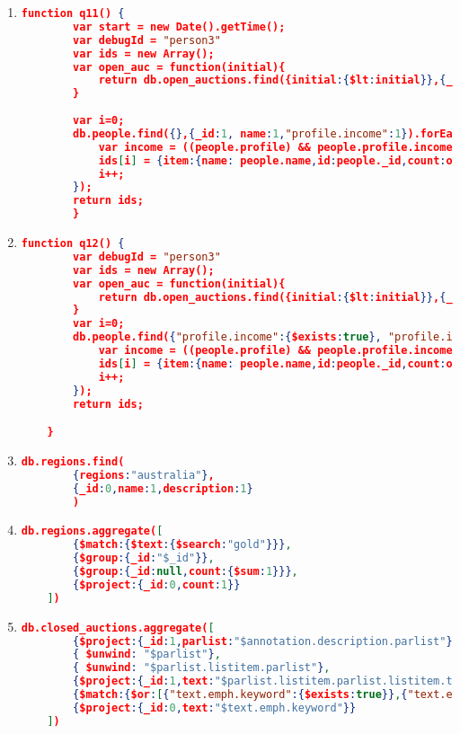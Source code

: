 \begin{enumerate}[label=Q\arabic*.]
\begin{lstlisting}[language=JSON,   basicstyle=\scriptsize]
    }
	\end{lstlisting}
	
	
    \item %
	\begin{lstlisting}[language=JSON,   basicstyle=\scriptsize]
	  function q11() {
    	var start = new Date().getTime();
    	var debugId = "person3"
    	var ids = new Array();
    	var open_auc = function(initial){
    		return db.open_auctions.find({initial:{$lt:initial}},{_id:1}).count();
    	}
    	
    	var i=0;
    	db.people.find({},{_id:1, name:1,"profile.income":1}).forEach(function(people){
    		var income = ((people.profile) && people.profile.income)? people.profile.income/5000:0;
    		ids[i] = {item:{name: people.name,id:people._id,count:open_auc(income)}};
    		i++;
    	});
    	return ids;
        }
	\end{lstlisting}
	
	
    \item %
	\begin{lstlisting}[language=JSON,   basicstyle=\scriptsize]
	   function q12() {
    	var debugId = "person3"
    	var ids = new Array();
    	var open_auc = function(initial){
    		return db.open_auctions.find({initial:{$lt:initial}},{_id:1}).count();
    	}
    	var i=0;
    	db.people.find({"profile.income":{$exists:true}, "profile.income":{$gt:50000}},{_id:1, name:1,"profile.income":1}).forEach(function(people){
    		var income = ((people.profile) && people.profile.income)? people.profile.income/5000:0;
    		ids[i] = {item:{name: people.name,id:people._id,count:open_auc(income)}};
    		i++;
    	});
    	return ids;

    }
	\end{lstlisting}
	
	\item %
	\begin{lstlisting}[language=JSON,   basicstyle=\scriptsize]
	    db.regions.find(
		{regions:"australia"},
		{_id:0,name:1,description:1}
        )
	\end{lstlisting}
	
    \item %
	\begin{lstlisting}[language=JSON,   basicstyle=\scriptsize]
	  db.regions.aggregate([
		{$match:{$text:{$search:"gold"}}},
		{$group:{_id:"$_id"}},
		{$group:{_id:null,count:{$sum:1}}},
		{$project:{_id:0,count:1}}
	])
	\end{lstlisting}
	
    \item %
	\begin{lstlisting}[language=JSON,   basicstyle=\scriptsize]
	 db.closed_auctions.aggregate([
		{$project:{_id:1,parlist:"$annotation.description.parlist"}},
		{ $unwind: "$parlist"},
		{ $unwind: "$parlist.listitem.parlist"},
		{$project:{_id:1,text:"$parlist.listitem.parlist.listitem.text"}},
		{$match:{$or:[{"text.emph.keyword":{$exists:true}},{"text.emph.keyword.childtext":{$exists:true}},{"text.emph.keyword.child":{$exists:true}}]}},
		{$project:{_id:0,text:"$text.emph.keyword"}}
	])
	\end{lstlisting}
	

\end{enumerate}

